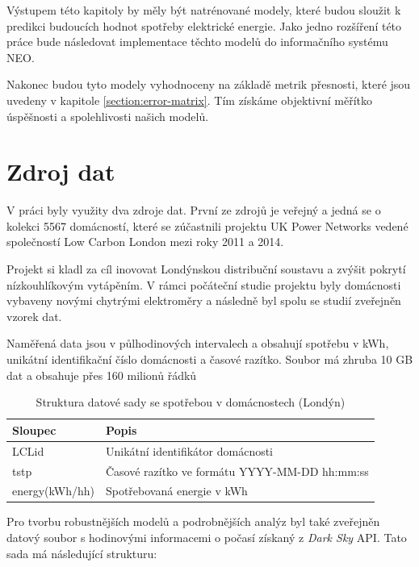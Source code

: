 \documentclass[FM,BP,fonts]{tulthesis}
\begin{document}
Výstupem této kapitoly by měly být natrénované modely, které budou sloužit k predikci budoucích hodnot spotřeby elektrické energie. Jako jedno rozšíření této práce bude následovat implementace těchto modelů do informačního systému NEO.  

Nakonec budou tyto modely vyhodnoceny na základě metrik přesnosti, které jsou uvedeny v kapitole \ref{section:error-matrix}. Tím získáme objektivní měřítko úspěšnosti a spolehlivosti našich modelů.



\section{Zdroj dat}
V práci byly využity dva zdroje dat. První ze zdrojů je veřejný a jedná se o kolekci 5567 domácností, které se zúčastnili projektu UK Power Networks vedené společností Low Carbon London mezi roky 2011 a 2014. 

Projekt si kladl za cíl inovovat Londýnskou distribuční soustavu a zvýšit pokrytí nízkouhlíkovým vytápěním. V rámci počáteční studie projektu byly domácnosti vybaveny novými chytrými elektroměry a následně byl spolu se studií zveřejněn vzorek dat. \cite{londondata}

Naměřená data jsou v půlhodinových intervalech a obsahují spotřebu v kWh, unikátní identifikační číslo domácnosti a časové razítko. Soubor má zhruba 10 GB dat a obsahuje přes 160 milionů řádků

\begin{table}[!ht]
	\centering
	\caption{Struktura datové sady se spotřebou v domácnostech (Londýn)}
	\begin{tabular}{ll}
		\hline
		\textbf{Sloupec} & \textbf{Popis} \\ \hline
		LCLid & Unikátní identifikátor domácnosti \\ 
		tstp & Časové razítko ve formátu YYYY-MM-DD hh:mm:ss \\ 
		energy(kWh/hh) & Spotřebovaná energie v kWh \\ 
		\hline
	\end{tabular}
\end{table}

Pro tvorbu robustnějších modelů a podrobnějších analýz byl také zveřejněn datový soubor s hodinovými informacemi o počasí získaný z \textit{Dark Sky} API. Tato sada má následující strukturu:
\end{document}
